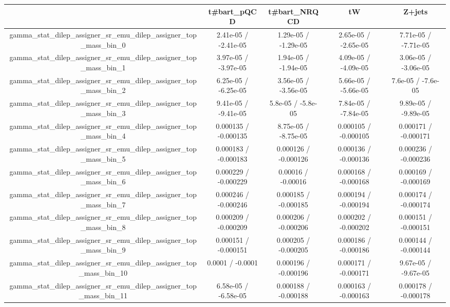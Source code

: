 \documentclass[10pt]{article}
\begin{document}
\begin{table}[htbp]
\begin{center}
\begin{tabular}{|c|c|c|c|c|}
\hline 
      & t#bar{t}_{pQCD}      & t#bar{t}_{NRQCD}      & tW      & Z+jets \\ 
\hline 
  gamma_stat_dilep_assigner_sr_emu_dilep_assigner_top_mass_bin_0 & 2.41e-05 / -2.41e-05 & 1.29e-05 / -1.29e-05 & 2.65e-05 / -2.65e-05 & 7.71e-05 / -7.71e-05 \\ 
  gamma_stat_dilep_assigner_sr_emu_dilep_assigner_top_mass_bin_1 & 3.97e-05 / -3.97e-05 & 1.94e-05 / -1.94e-05 & 4.09e-05 / -4.09e-05 & 3.06e-05 / -3.06e-05 \\ 
  gamma_stat_dilep_assigner_sr_emu_dilep_assigner_top_mass_bin_2 & 6.25e-05 / -6.25e-05 & 3.56e-05 / -3.56e-05 & 5.66e-05 / -5.66e-05 & 7.6e-05 / -7.6e-05 \\ 
  gamma_stat_dilep_assigner_sr_emu_dilep_assigner_top_mass_bin_3 & 9.41e-05 / -9.41e-05 & 5.8e-05 / -5.8e-05 & 7.84e-05 / -7.84e-05 & 9.89e-05 / -9.89e-05 \\ 
  gamma_stat_dilep_assigner_sr_emu_dilep_assigner_top_mass_bin_4 & 0.000135 / -0.000135 & 8.75e-05 / -8.75e-05 & 0.000105 / -0.000105 & 0.000171 / -0.000171 \\ 
  gamma_stat_dilep_assigner_sr_emu_dilep_assigner_top_mass_bin_5 & 0.000183 / -0.000183 & 0.000126 / -0.000126 & 0.000136 / -0.000136 & 0.000236 / -0.000236 \\ 
  gamma_stat_dilep_assigner_sr_emu_dilep_assigner_top_mass_bin_6 & 0.000229 / -0.000229 & 0.00016 / -0.00016 & 0.000168 / -0.000168 & 0.000169 / -0.000169 \\ 
  gamma_stat_dilep_assigner_sr_emu_dilep_assigner_top_mass_bin_7 & 0.000246 / -0.000246 & 0.000185 / -0.000185 & 0.000194 / -0.000194 & 0.000174 / -0.000174 \\ 
  gamma_stat_dilep_assigner_sr_emu_dilep_assigner_top_mass_bin_8 & 0.000209 / -0.000209 & 0.000206 / -0.000206 & 0.000202 / -0.000202 & 0.000151 / -0.000151 \\ 
  gamma_stat_dilep_assigner_sr_emu_dilep_assigner_top_mass_bin_9 & 0.000151 / -0.000151 & 0.000205 / -0.000205 & 0.000186 / -0.000186 & 0.000144 / -0.000144 \\ 
  gamma_stat_dilep_assigner_sr_emu_dilep_assigner_top_mass_bin_10 & 0.0001 / -0.0001 & 0.000196 / -0.000196 & 0.000171 / -0.000171 & 9.67e-05 / -9.67e-05 \\ 
  gamma_stat_dilep_assigner_sr_emu_dilep_assigner_top_mass_bin_11 & 6.58e-05 / -6.58e-05 & 0.000188 / -0.000188 & 0.000163 / -0.000163 & 0.000178 / -0.000178 \\ 

\end{tabular}
\end{center}
\end{table}
\end{document}

